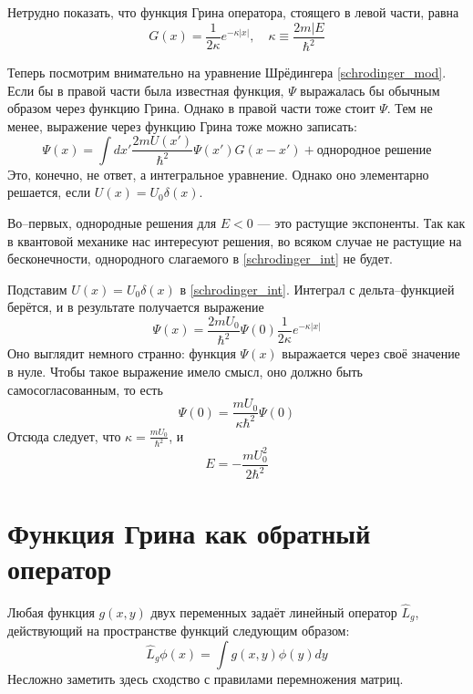 \documentclass{article}
\begin{document}
Нетрудно показать, что функция Грина оператора, стоящего в левой части, равна
\begin{equation}
    G(x) = \frac{1}{2\kappa} e^{-\kappa |x|}, \quad \kappa \equiv \frac{2m|E}{\hbar^2}
\end{equation}

Теперь посмотрим внимательно на уравнение Шрёдингера \eqref{schrodinger_mod}. Если бы
в правой части была известная функция, $\Psi$ выражалась бы обычным образом через 
функцию Грина. Однако в правой части тоже стоит $\Psi$. Тем не менее, выражение через 
функцию Грина тоже можно записать:
\begin{equation}
    \label{schrodinger_int}
    \Psi(x) = \int dx' \frac{2mU(x')}{\hbar^2} \Psi(x') G(x - x') + \text{однородное решение}
\end{equation}
Это, конечно, не ответ, а интегральное уравнение. Однако оно элементарно решается, если
$U(x) = U_0 \delta(x)$. 

Во--первых, однородные решения для $E < 0$ --- это растущие экспоненты. Так как в квантовой
механике нас интересуют решения, во всяком случае не растущие на бесконечности, однородного
слагаемого в \eqref{schrodinger_int} не будет. 

Подставим $U(x) = U_0 \delta(x)$ в \eqref{schrodinger_int}. Интеграл с дельта--функцией 
берётся, и в результате получается выражение
\begin{equation}
   \Psi(x) = \frac{2mU_0}{\hbar^2} \Psi(0) \frac{1}{2\kappa} e^{-\kappa |x|}
\end{equation}
Оно выглядит немного странно: функция $\Psi(x)$ выражается через своё значение в нуле. 
Чтобы такое выражение имело смысл, оно должно быть самосогласованным, то есть
\begin{equation}
   \Psi(0) = \frac{mU_0}{\kappa\hbar^2} \Psi(0) 
\end{equation}
Отсюда следует, что $\kappa = \frac{mU_0}{\hbar^2}$, и 
\begin{equation}
    E = -\frac{mU_0^2}{2\hbar^2}
\end{equation}

\section{Функция Грина как обратный оператор}
Любая функция $g(x,y)$ 
двух переменных задаёт линейный оператор $\hat{L}_g$, действующий 
на пространстве функций следующим образом:
\begin{equation}
    \hat{L}_g\phi(x) = \int  g(x,y) \phi(y) dy
\end{equation}
Несложно заметить здесь сходство с правилами перемножения матриц.
\end{document}
